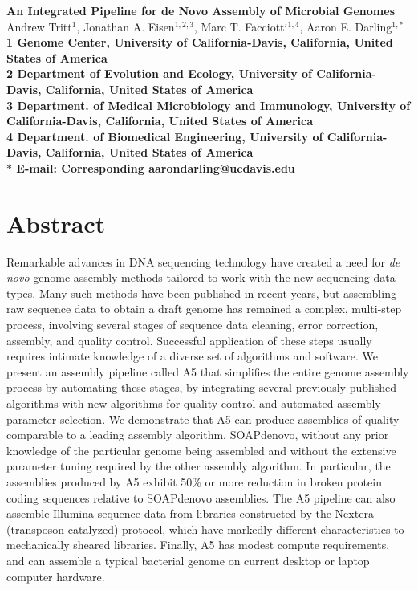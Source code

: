 \documentclass[10pt]{article}
\date{}
\begin{document}
\begin{flushleft}
{\Large
\textbf{An Integrated Pipeline for de Novo Assembly of Microbial Genomes}
}
\\
Andrew Tritt$^{1}$, 
Jonathan A. Eisen$^{1,2,3}$, 
Marc T. Facciotti$^{1,4}$, 
Aaron E. Darling$^{1,\ast}$
\\
\bf{1} Genome Center, University of California-Davis, California, United States of America
\\
\bf{2} Department of Evolution and Ecology, University of California-Davis, California, United States of America
\\
\bf{3} Department. of Medical Microbiology and Immunology, University of California-Davis, California, United States of America
\\
\bf{4} Department. of Biomedical Engineering, University of California-Davis, California, United States of America
\\
$\ast$ E-mail: Corresponding aarondarling@ucdavis.edu
\end{flushleft}

\section*{Abstract}
Remarkable advances in DNA sequencing technology have created a need for \textit{de novo} genome assembly methods
tailored to work with the new sequencing data types. Many such methods have been published in recent years, but assembling
raw sequence data to obtain a draft genome has remained a complex, multi-step process, 
involving several stages of sequence data cleaning, error correction, assembly, and quality control. 
Successful application of these steps usually requires intimate knowledge of a diverse set of algorithms and software. 
We present an assembly pipeline called A5 that simplifies the entire genome assembly process by automating these stages, by
integrating several previously published algorithms with new algorithms for quality control and automated assembly parameter selection.
We demonstrate that A5 can produce assemblies of quality comparable to a leading assembly algorithm, SOAPdenovo, without
any prior knowledge of the particular genome being assembled and without the extensive parameter tuning required
by the other assembly algorithm. 
In particular, the assemblies produced by A5 exhibit 50\% or more reduction in broken protein coding sequences relative to SOAPdenovo assemblies.
The A5 pipeline can also assemble Illumina sequence data from libraries constructed by the Nextera
(transposon-catalyzed) protocol, which have markedly different characteristics to mechanically sheared libraries.
Finally, A5 has modest compute requirements, and can assemble a typical bacterial genome on current desktop or laptop computer hardware.
\end{document}
